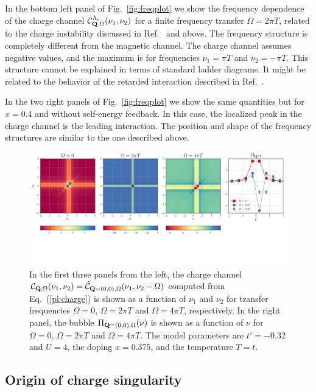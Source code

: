 In the bottom left panel of Fig.~\ref{fig:freqplot} we show the frequency dependence of the charge channel $\mathcal{C}^{\Lambda_\mathrm{c}}_{\mathbf{Q},\Omega}(\nu_1,\nu_2)$ for a finite frequency transfer $\Omega=2\pi T$, related to the charge instability discussed in Ref.~ and above. 
The frequency structure is completely different from the magnetic channel. 
The charge channel assumes negative values, and the maximum is for frequencies $\nu_1 = \pi T$ and $\nu_2=-\pi T$. 
This structure cannot be explained in terms of standard ladder diagrams. It might be related to the behavior of the retarded interaction described in Ref.~.

In the two right panels of Fig.~\ref{fig:freqplot} we show the same quantities but for $x=0.4$ and without self-energy feedback. In this case, the localized peak in the charge channel is the leading interaction. The position and shape of the frequency structures are similar to the one described above.

\begin{figure}
\includegraphics[width=\textwidth]{images/PL_all.png}
\vspace*{-2.0cm}
\caption{In the first three panels from the left, the charge channel
$\mathcal{C}_{\mathbf{Q},\Omega} (\nu_1,\nu_2) =
 \mathcal{\tilde C}_{\mathbf{Q}=(0,0),\Omega}(\nu_1,\nu_2-\Omega)$
computed from Eq.~(\ref{pl:charge}) is shown as a function of $\nu_1$ and $\nu_2$ for transfer frequencies $\Omega=0$, $\Omega=2\pi T$ and $\Omega=4\pi T$, respectively. In the right panel, the bubble $\Pi_{\mathbf{Q}=(0,0),\Omega}(\nu)$ is shown as a function of $\nu$ for $\Omega=0$, $\Omega=2\pi T$ and $\Omega=4\pi T$. The model parameters are $t'=-0.32$ and $U=4$, the doping $x=0.375$, and the temperature $T=t$.} 
\label{fig:perpladder}
\end{figure}

\subsection{Origin of charge singularity} 
\label{sec:PerpLadder}

